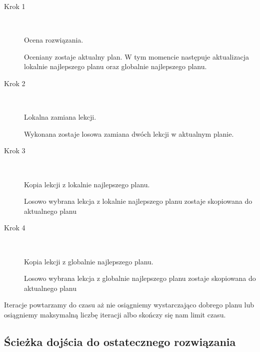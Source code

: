 \begin{description}
  \item[Krok 1] \hfill \\
     \par Ocena rozwiązania. \hfill \\
   \par Oceniany zostaje aktualny plan. W tym momencie następuje aktualizacja lokalnie najlepszego planu oraz globalnie najlepszego planu.
  \item[Krok 2] \hfill \\
     \par Lokalna zamiana lekcji. \hfill \\
    \par Wykonana zostaje losowa zamiana dwóch lekcji w aktualnym planie.

  \item[Krok 3] \hfill \\
      \par Kopia lekcji z lokalnie najlepszego planu. \hfill \\
        \par Losowo wybrana lekcja z lokalnie najlepszego planu zostaje skopiowana do aktualnego planu 
  \item[Krok 4] \hfill \\
      \par Kopia lekcji z globalnie najlepszego planu. \hfill \\
        \par Losowo wybrana lekcja z globalnie najlepszego planu zostaje skopiowana do aktualnego planu 
\end{description}
\par Iteracje powtarzamy do czasu aż nie osiągniemy wystarczająco dobrego planu lub osiągniemy maksymalną liczbę iteracji albo skończy się nam limit czasu.
\subsection{Ścieżka dojścia do ostatecznego rozwiązania}
